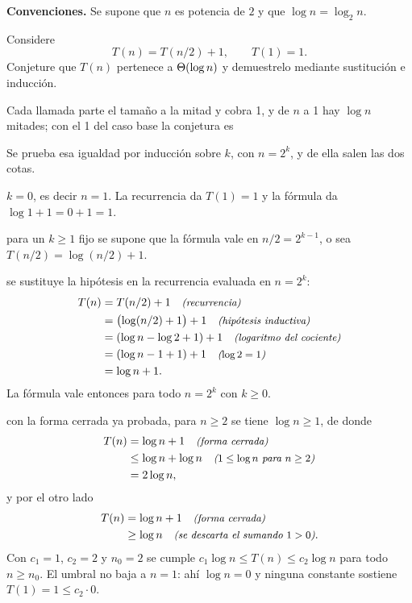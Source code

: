 \documentclass[11pt,letterpaper]{article}
\begin{document}

\noindent\textbf{Convenciones.}
Se supone que $n$ es potencia de $2$ y que
$\log n = \log_2 n$.

\noindent Considere
\[
  T(n) = T(n/2) + 1, \qquad T(1) = 1 .
\]
Conjeture que $T(n)$ pertenece a $\Theta\!\left(\log n\right)$ y demuestrelo mediante
sustitución e inducción.

\medskip
\noindent Cada llamada parte el tamaño a la mitad y cobra 1, y de $n$
a 1 hay $\log n$ mitades; con el 1 del caso base la conjetura es

\noindent Se prueba esa igualdad por inducción sobre $k$, con
$n = 2^k$, y de ella salen las dos cotas.

 $k = 0$, es decir $n = 1$. La recurrencia da
$T(1) = 1$ y la fórmula da $\log 1 + 1 = 0 + 1 = 1$.

 para un $k \ge 1$ fijo se supone que la
fórmula vale en $n/2 = 2^{k-1}$, o sea $T(n/2) = \log(n/2) + 1$.

 se sustituye la hipótesis en la recurrencia
evaluada en $n = 2^k$:
\begin{align*}
  T(n) &= T(n/2) + 1
         \quad\text{\small\itshape (recurrencia)} \\
       &= \bigl( \log(n/2) + 1 \bigr) + 1
         \quad\text{\small\itshape (hipótesis inductiva)} \\
       &= (\log n - \log 2 + 1) + 1
         \quad\text{\small\itshape (logaritmo del cociente)} \\
       &= (\log n - 1 + 1) + 1
         \quad\text{\small\itshape ($\log 2 = 1$)} \\
       &= \log n + 1 .
\end{align*}
La fórmula vale entonces para todo $n = 2^k$ con $k \ge 0$.

 con la forma cerrada ya probada, para $n \ge 2$ se tiene
$\log n \ge 1$, de donde
\begin{align*}
  T(n) &= \log n + 1
         \quad\text{\small\itshape (forma cerrada)} \\
       &\le \log n + \log n
         \quad\text{\small\itshape ($1 \le \log n$ para $n \ge 2$)} \\
       &= 2 \log n ,
\end{align*}
y por el otro lado
\begin{align*}
  T(n) &= \log n + 1
         \quad\text{\small\itshape (forma cerrada)} \\
       &\ge \log n
         \quad\text{\small\itshape (se descarta el sumando $1 > 0$)} .
\end{align*}
Con $c_1 = 1$, $c_2 = 2$ y $n_0 = 2$ se cumple
$c_1 \log n \le T(n) \le c_2 \log n$ para todo $n \ge n_0$. El umbral
no baja a $n = 1$: ahí $\log n = 0$ y ninguna constante sostiene
$T(1) = 1 \le c_2 \cdot 0$.

\end{document}
